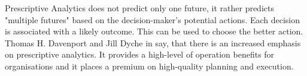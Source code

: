 \documentclass[runningheads]{llncs}
\begin{document}
Prescriptive Analytics does not predict only one future, it rather predicts "multiple futures" based on the decision-maker’s potential actions. Each decision is associated with a likely outcome. This can be used to choose the better action. Thomas H. Davenport and Jill Dyche in \cite{DAVENPORT} say, that there is an increased emphasis on prescriptive analytics. It provides a high-level of operation benefits for organisations and it places a premium on high-quality planning and execution. 


\end{document}
